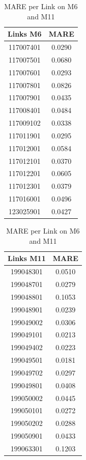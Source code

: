 \documentclass[letterpaper, 10 pt, conference]{ieeeconf}  %
\begin{document}
\begin{table}[htbp]
	\caption{MARE per Link on M6 and M11}
	\begin{center}
		\begin{tabular}{|c|c|}
			\hline
			\textbf{Links M6}&{\textbf{MARE}} \\
			\hline
			117007401& 0.0290\\
			\hline
			117007501& 0.0680\\
			\hline
			117007601& 0.0293\\
			\hline
			117007801& 0.0826\\
			\hline
			117007901& 0.0435\\
			\hline
			117008401& 0.0484\\
			\hline
			117009102& 0.0338\\
			\hline
			117011901& 0.0295\\
			\hline
			117012001& 0.0584\\
			\hline
			117012101& 0.0370\\
			\hline
			117012201& 0.0605\\
			\hline
			117012301& 0.0379\\
			\hline
			117016001& 0.0496\\
			\hline
			123025901& 0.0427\\
			\hline
		\end{tabular}
		\quad
		\begin{tabular}{|c|c|}
			\hline
			\textbf{Links M11}&{\textbf{MARE}} \\
			\hline
			199048301& 0.0510\\
			\hline
			199048701& 0.0279\\
			\hline
			199048801& 0.1053\\
			\hline
			199048901& 0.0239\\
			\hline
			199049002& 0.0306\\
			\hline
			199049101& 0.0213\\
			\hline
			199049402& 0.0223\\
			\hline
			199049501& 0.0181\\
			\hline
			199049702& 0.0297\\
			\hline
			199049801& 0.0408\\
			\hline
			199050002& 0.0445\\
			\hline
			199050101& 0.0272\\
			\hline
			199050202& 0.0288\\
			\hline
			199050901& 0.0433\\
			\hline
			199063301& 0.1203\\

\end{tabular}
\end{center}
\end{table}
\end{document}
